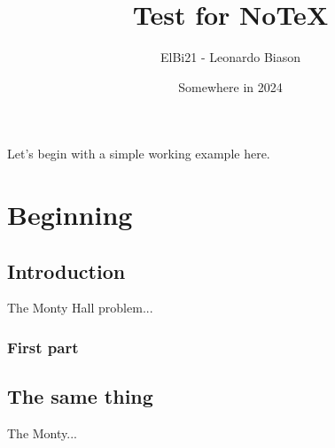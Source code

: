 \documentclass{notex}
\title{Test for NoTeX}
\author{ElBi21 - Leonardo Biason}
\date{Somewhere in 2024}
\begin{document}
\maketitle

\noindent
Let's begin with a simple working example here.

\blindtext

\pagebreak
\chapter{Beginning}

\blindtext

\section{Introduction}

The Monty Hall problem...

\subsection{First part}

\blindtext

\section{The same thing}

The Monty...
\end{document}

